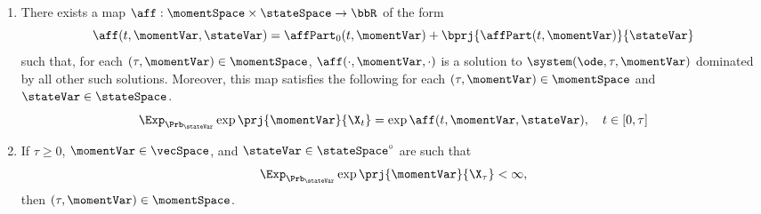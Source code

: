\begin{theorem}
  \label{theorem:KM}
  \begin{enumerate}[label=(\alph*)]
    \item
      \label{theorem:KM:1}
      There exists a map $\aff: \momentSpace \times \stateSpace \rightarrow \bbR$ of the form
      \begin{equation}
        \aff(t,\momentVar,\stateVar) = \affPart_0(t,\momentVar) + \bprj{\affPart(t,\momentVar)}{\stateVar}
      \end{equation}
      such that, for each $(\tau,\momentVar) \in \momentSpace$, $\aff(\cdot,\momentVar,\cdot)$ is a solution to $\system(\ode,\tau,\momentVar)$ dominated by all other such solutions.
      Moreover, this map satisfies the following for each $(\tau, \momentVar) \in \momentSpace$ and $\stateVar \in \stateSpace$.
      \begin{equation}
        \label{theorem:KM-moments}
        \Exp_{\Prb_\stateVar}\exp\prj{\momentVar}{\X_t} = \exp\aff(t, \momentVar, \stateVar), \quad t \in [0,\tau]
      \end{equation}
    \item
      \label{theorem:KM:2}
      If $\tau \geq 0$, $\momentVar \in \vecSpace$, and $\stateVar \in \stateSpace^\circ$ are such that
      \begin{equation}
        \Exp_{\Prb_\stateVar}\exp\prj{\momentVar}{\X_\tau} < \infty,
      \end{equation}
      then $(\tau, \momentVar) \in \momentSpace$.
  \end{enumerate}
\end{theorem}
